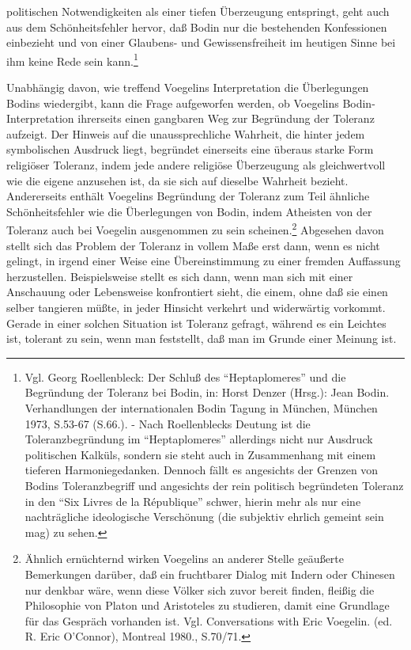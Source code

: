 politischen Notwendigkeiten als einer tiefen Überzeugung entspringt, geht auch
aus dem Schönheitsfehler hervor, daß Bodin nur die bestehenden Konfessionen
einbezieht und von einer Glaubens- und Gewissensfreiheit im heutigen Sinne bei
ihm keine Rede sein kann.\footnote{Vgl. Georg Roellenbleck: Der Schluß des
  "`Heptaplomeres"' und die Begründung der Toleranz bei Bodin, in: Horst
  Denzer (Hrsg.): Jean Bodin.  Verhandlungen der internationalen Bodin Tagung
  in München, München 1973, S.53-67 (S.66.). - Nach Roellenblecks Deutung ist
  die Toleranzbegründung im "`Heptaplomeres"' allerdings nicht nur Ausdruck
  politischen Kalküls, sondern sie steht auch in Zusammenhang mit einem
  tieferen Harmoniegedanken. Dennoch fällt es angesichts der Grenzen von
  Bodins Toleranzbegriff und angesichts der rein politisch begründeten
  Toleranz in den "`Six Livres de la République"' schwer, hierin mehr als
  nur eine nachträgliche ideologische Verschönung (die subjektiv ehrlich
  gemeint sein mag) zu sehen.}

Unabhängig davon, wie treffend Voegelins Interpretation die Überlegungen
Bodins wiedergibt, kann die Frage aufgeworfen werden, ob Voegelins
Bodin-Interpretation ihrerseits einen gangbaren Weg zur Begründung der
Toleranz aufzeigt. Der Hinweis auf die unaussprechliche Wahrheit, die
hinter jedem symbolischen Ausdruck liegt, begründet einerseits eine
überaus starke Form religiöser Toleranz, indem jede andere religiöse
Überzeugung als gleichwertvoll wie die eigene anzusehen ist, da sie sich
auf dieselbe Wahrheit bezieht. Andererseits enthält Voegelins Begründung
der Toleranz zum Teil ähnliche Schönheitsfehler wie die Überlegungen von
Bodin, indem Atheisten von der Toleranz auch bei Voegelin ausgenommen zu
sein scheinen.\footnote{Ähnlich ernüchternd wirken Voegelins an anderer
  Stelle geäußerte Bemerkungen darüber, daß ein fruchtbarer Dialog mit
  Indern oder Chinesen nur denkbar wäre, wenn diese Völker sich zuvor
  bereit finden, fleißig die Philosophie von Platon und Aristoteles zu
  studieren, damit eine Grundlage für das Gespräch vorhanden ist. Vgl.
  Conversations with Eric Voegelin. (ed. R. Eric O'Connor), Montreal
  1980., S.70/71.} Abgesehen davon stellt sich das Problem der Toleranz
in vollem Maße erst dann, wenn es nicht gelingt, in irgend einer Weise
eine Übereinstimmung zu einer fremden Auffassung herzustellen.
Beispielsweise stellt es sich dann, wenn man sich mit einer Anschauung
oder Lebensweise konfrontiert sieht, die einem, ohne daß sie einen
selber tangieren müßte, in jeder Hinsicht verkehrt und widerwärtig
vorkommt. Gerade in einer solchen Situation ist Toleranz gefragt,
während es ein Leichtes ist, tolerant zu sein, wenn man feststellt, daß
man im Grunde einer Meinung ist.

